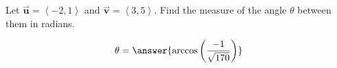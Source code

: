\documentclass{ximera}
\author{Gregory Hartman \and Matthew Carr}
\begin{document}
\begin{exercise}
Let $\overset{\boldsymbol{\rightharpoonup}}{\mathbf{u}} = \left< -2,1 \right>$ and $\overset{\boldsymbol{\rightharpoonup}}{\mathbf{v}} = \left< 3,5 \right>$. Find the
measure of the angle $\theta$ between them in radians.
\begin{prompt}
\[
\theta=\answer{\arccos\left(\frac{-1}{\sqrt{170}}\right)}
\]
\end{prompt}

\end{exercise}
\end{document}
